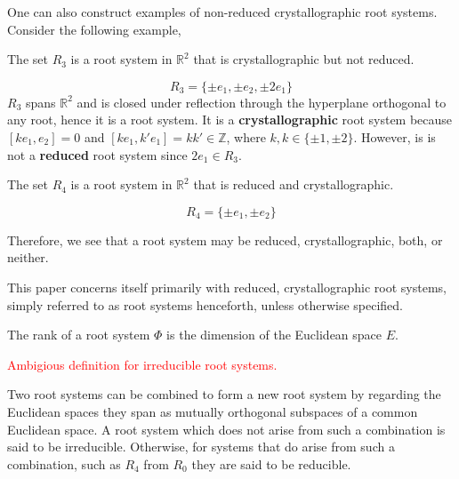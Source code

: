 One can also construct examples of non-reduced crystallographic root systems. Consider the following example,

\begin{example}
    The set $R_3$ is a root system in $\mathbb{R}^2$ that is crystallographic but not reduced.
    
    \begin{equation*}
        R_3 = \{
            \pm e_1, \pm e_2, \pm 2 e_1
        \} 
    \end{equation*}
    $R_3$ spans $\mathbb{R}^2$ and is closed under reflection through the hyperplane orthogonal to any root, hence it is a root system.
    It is a \textbf{crystallographic} root system because $[ k e_1, e_2 ] = 0$ and $[ k e_1, k' e_1 ] = kk' \in \mathbb{Z}$, where $k,k \in \{\pm 1, \pm 2\}$.
    However, is is not a \textbf{reduced} root system since $2 e_1 \in R_3$.
\end{example}


\begin{example}
    The set $R_4$ is a root system in $\mathbb{R}^2$ that is reduced and crystallographic.
    
    \begin{equation*}
        R_4 = \{
            \pm e_1, \pm e_2
            \} 
        \end{equation*}
    \end{example}

Therefore, we see that a root system may be reduced, crystallographic, both, or neither.

This paper concerns itself primarily with reduced, crystallographic root systems, simply referred to as root systems henceforth, unless otherwise specified.

\begin{definition}
    The rank of a root system $\Phi$ is the dimension of the Euclidean space $E$.
\end{definition}

\textcolor{red}{Ambigious definition for irreducible root systems.}

\begin{definition}
    Two root systems can be combined to form a new root system by regarding the Euclidean spaces they span as mutually orthogonal subspaces of a common Euclidean space.
    A root system which does not arise from such a combination is said to be irreducible. Otherwise, for systems that do arise from such a combination, such as $R_4$ from $R_0$ they are said to be reducible.
\end{definition}


